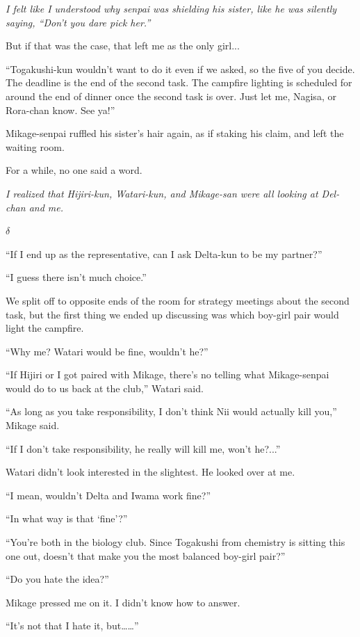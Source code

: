 \documentclass[
    a4paper,
    12pt,
    twoside,
    openany,
    UTF8,
    fontset=windows
]{ctexbook}
\begin{document}
\textit{I felt like I understood why senpai was shielding his sister, like he was silently saying, ``Don't you dare pick her.''}

But if that was the case, that left me as the only girl...

``Togakushi-kun wouldn't want to do it even if we asked, so the five of you decide. The deadline is the end of the second task. The campfire lighting is scheduled for around the end of dinner once the second task is over. Just let me, Nagisa, or Rora-chan know. See ya!''

Mikage-senpai ruffled his sister's hair again, as if staking his claim, and left the waiting room.

For a while, no one said a word.

\textit{I realized that Hijiri-kun, Watari-kun, and Mikage-san were all looking at Del-chan and me.}

$\delta$

``If I end up as the representative, can I ask Delta-kun to be my partner?''

``I guess there isn't much choice.''

We split off to opposite ends of the room for strategy meetings about the second task, but the first thing we ended up discussing was which boy-girl pair would light the campfire.

``Why me? Watari would be fine, wouldn't he?''

``If Hijiri or I got paired with Mikage, there's no telling what Mikage-senpai would do to us back at the club,'' Watari said.

``As long as you take responsibility, I don't think Nii would actually kill you,'' Mikage said.

``If I don't take responsibility, he really will kill me, won't he?...''

Watari didn't look interested in the slightest. He looked over at me.

``I mean, wouldn't Delta and Iwama work fine?''

``In what way is that `fine'?''

``You're both in the biology club. Since Togakushi from chemistry is sitting this one out, doesn't that make you the most balanced boy-girl pair?''

``Do you hate the idea?''

Mikage pressed me on it. I didn't know how to answer.

``It's not that I hate it, but\dots\dots''
\end{document}
